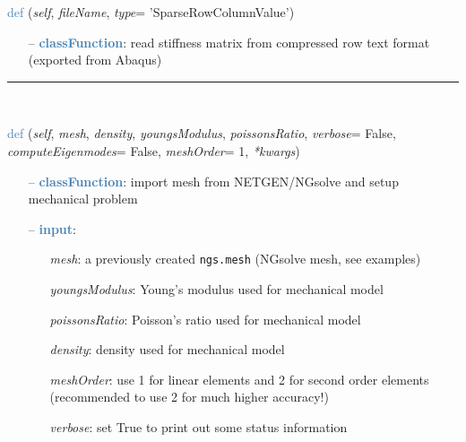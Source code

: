 \begin{itemize}[leftmargin=1.4cm]
\begin{itemize}[leftmargin=0.5cm]
\begin{itemize}[leftmargin=1.4cm]
\begin{itemize}[leftmargin=1.4cm]
\begin{itemize}[leftmargin=0.5cm]
\begin{flushleft}
\noindent \textcolor{steelblue}{def {\bf {}}}\label{sec:FEM:FEMinterface:ReadStiffnessMatrixFromAbaqus}
({\it self}, {\it fileName}, {\it type}= 'SparseRowColumnValue')
\end{flushleft}
\setlength{\itemindent}{0.7cm}
\begin{itemize}[leftmargin=0.7cm]
  \item[--]  \textcolor{steelblue}{\bf classFunction}: read stiffness matrix from compressed row text format (exported from Abaqus)\vspace{12pt}\end{itemize}
%
\noindent\rule{8cm}{0.75pt}\vspace{1pt} \\ 
\begin{flushleft}
\noindent \textcolor{steelblue}{def {\bf {}}}\label{sec:FEM:FEMinterface:ImportMeshFromNGsolve}
({\it self}, {\it mesh}, {\it density}, {\it youngsModulus}, {\it poissonsRatio}, {\it verbose}= False, {\it computeEigenmodes}= False, {\it meshOrder}= 1, {\it **kwargs})
\end{flushleft}
\setlength{\itemindent}{0.7cm}
\begin{itemize}[leftmargin=0.7cm]
  \item[--]  \textcolor{steelblue}{\bf classFunction}: import mesh from NETGEN/NGsolve and setup mechanical problem  \item[--]  \textcolor{steelblue}{\bf input}: \vspace{-6pt}
  \begin{itemize}[leftmargin=1.2cm]
\setlength{\itemindent}{-0.7cm}
    \item[] {\it mesh}: a previously created \texttt{ngs.mesh} (NGsolve mesh, see examples)
    \item[] {\it     youngsModulus}: Young's modulus used for mechanical model
    \item[] {\it     poissonsRatio}: Poisson's ratio used for mechanical model
    \item[] {\it     density}: density used for mechanical model
    \item[] {\it     meshOrder}: use 1 for linear elements and 2 for second order elements (recommended to use 2 for much higher accuracy!)
    \item[] {\it     verbose}: set True to print out some status information

\end{itemize}
\end{itemize}
\end{itemize}
\end{itemize}
\end{itemize}
\end{itemize}
\end{itemize}
